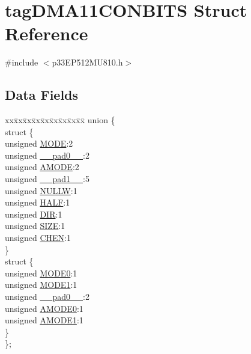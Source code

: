\hypertarget{structtag_d_m_a11_c_o_n_b_i_t_s}{}\section{tag\+D\+M\+A11\+C\+O\+N\+B\+I\+TS Struct Reference}
\label{structtag_d_m_a11_c_o_n_b_i_t_s}


{\ttfamily \#include $<$p33\+E\+P512\+M\+U810.\+h$>$}

\subsection*{Data Fields}
\begin{DoxyCompactItemize}
\item 
\begin{tabbing}
xx\=xx\=xx\=xx\=xx\=xx\=xx\=xx\=xx\=\kill
union \{\\
\>struct \{\\
\>\>unsigned \hyperlink{structtag_d_m_a11_c_o_n_b_i_t_s_adc56ba18ff3f1599c85d222bee624424}{MODE}:2\\
\>\>unsigned \hyperlink{structtag_d_m_a11_c_o_n_b_i_t_s_adf71f3d8410c1f1dbbc96680a92c49af}{\_\_pad0\_\_}:2\\
\>\>unsigned \hyperlink{structtag_d_m_a11_c_o_n_b_i_t_s_ab3ff4e1f1b9a1037418ca7b6cb2e8f77}{AMODE}:2\\
\>\>unsigned \hyperlink{structtag_d_m_a11_c_o_n_b_i_t_s_acaf2d0924a107ec6e8d2e31febaf66f9}{\_\_pad1\_\_}:5\\
\>\>unsigned \hyperlink{structtag_d_m_a11_c_o_n_b_i_t_s_a1d3f7d04416314131889d1671a9287ad}{NULLW}:1\\
\>\>unsigned \hyperlink{structtag_d_m_a11_c_o_n_b_i_t_s_a1a715a64b2576f59401ac93d6f9a086a}{HALF}:1\\
\>\>unsigned \hyperlink{structtag_d_m_a11_c_o_n_b_i_t_s_ad6868749602045a76f36ffdf964dfd39}{DIR}:1\\
\>\>unsigned \hyperlink{structtag_d_m_a11_c_o_n_b_i_t_s_a5863cac6dc2cb330bdd0b1c66da70ffe}{SIZE}:1\\
\>\>unsigned \hyperlink{structtag_d_m_a11_c_o_n_b_i_t_s_a092934036fdfb8df5259db288fe438ca}{CHEN}:1\\
\>\} \\
\>struct \{\\
\>\>unsigned \hyperlink{structtag_d_m_a11_c_o_n_b_i_t_s_abc938903e74bff48935569d0c5b19035}{MODE0}:1\\
\>\>unsigned \hyperlink{structtag_d_m_a11_c_o_n_b_i_t_s_a7a9f7514566d0626724ce6c4b81b5ea2}{MODE1}:1\\
\>\>unsigned \hyperlink{structtag_d_m_a11_c_o_n_b_i_t_s_adf71f3d8410c1f1dbbc96680a92c49af}{\_\_pad0\_\_}:2\\
\>\>unsigned \hyperlink{structtag_d_m_a11_c_o_n_b_i_t_s_a0a1f894a2695c1388a5412244636805b}{AMODE0}:1\\
\>\>unsigned \hyperlink{structtag_d_m_a11_c_o_n_b_i_t_s_a3fde4abc0dc3db6fef6afc28c565ce3e}{AMODE1}:1\\
\>\} \\
\}; \\


\end{tabbing}
\end{DoxyCompactItemize}
